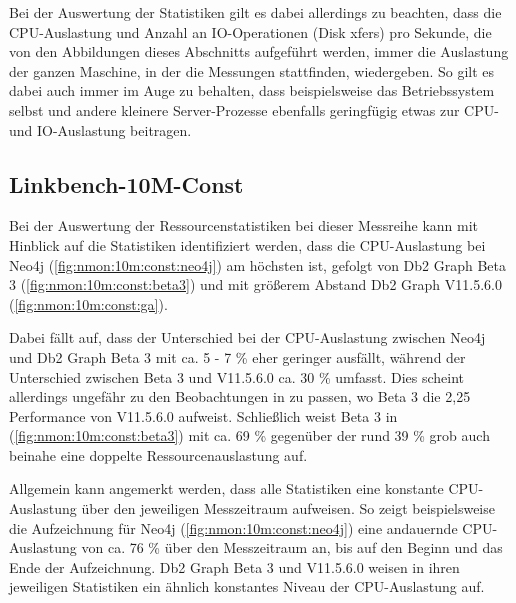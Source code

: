 Bei der Auswertung der Statistiken gilt es dabei allerdings zu beachten, dass die CPU-Auslastung und Anzahl an IO-Ope\-ra\-ti\-on\-en (Disk xfers) pro Sekunde, die von den Abbildungen dieses Abschnitts aufgeführt werden, immer die Auslastung der ganzen Maschine, in der die Messungen stattfinden, wiedergeben. So gilt es dabei auch immer im Auge zu behalten, dass beispielsweise das Betriebssystem selbst und andere kleinere Server-Prozesse ebenfalls geringfügig etwas zur CPU- und IO-Aus\-last\-ung beitragen.  

\subsection{Linkbench-10M-Const}
\label{auswertung:ressourcenauslastung:const}
Bei der Auswertung der Ressourcenstatistiken bei dieser Messreihe kann mit Hinblick auf die Statistiken identifiziert werden, dass die CPU-Auslastung bei Neo4j (\autoref{fig:nmon:10m:const:neo4j}) am höchsten ist, gefolgt von Db2 Graph Beta 3 (\autoref{fig:nmon:10m:const:beta3}) und mit größerem Abstand Db2 Graph V11.5.6.0 (\autoref{fig:nmon:10m:const:ga}). 

Dabei fällt auf, dass der Unterschied bei der CPU-Auslastung zwischen Neo4j und Db2 Graph Beta 3 mit ca. 5 - 7 \% eher geringer ausfällt, während der Unterschied zwischen Beta 3 und V11.5.6.0 ca. 30 \% umfasst. Dies scheint allerdings ungefähr zu den Beobachtungen in  zu passen, wo Beta 3 die 2,25 Performance von V11.5.6.0 aufweist. Schließlich weist Beta 3 in (\autoref{fig:nmon:10m:const:beta3}) mit ca. 69 \% gegenüber der rund 39 \% grob auch beinahe eine doppelte Ressourcenauslastung auf.

Allgemein kann angemerkt werden, dass alle Statistiken eine konstante CPU-Auslastung über den jeweiligen Messzeitraum aufweisen. So zeigt beispielsweise die Aufzeichnung für Neo4j (\autoref{fig:nmon:10m:const:neo4j}) eine andauernde CPU-Auslastung von ca. 76 \% über den Messzeitraum an, bis auf den Beginn und das Ende der Aufzeichnung. Db2 Graph Beta 3 und V11.5.6.0 weisen in ihren jeweiligen Statistiken ein ähnlich konstantes Niveau der CPU-Auslastung auf. 

